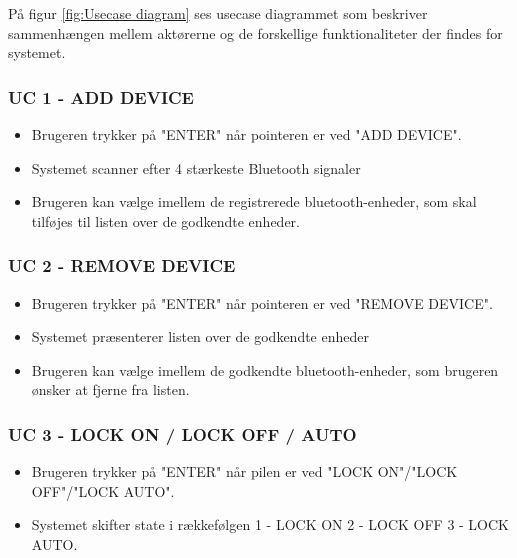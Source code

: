 På figur \ref{fig:Usecase diagram} ses usecase diagrammet som beskriver sammenhængen mellem aktørerne og de forskellige funktionaliteter der findes for systemet.

\subsubsection{UC 1 - ADD DEVICE}
\begin{itemize}
\item Brugeren trykker på "ENTER" når pointeren er ved "ADD DEVICE".
\item Systemet scanner efter 4 stærkeste Bluetooth signaler
\item Brugeren kan vælge imellem de registrerede bluetooth-enheder, som skal tilføjes til listen over de godkendte enheder.
\end{itemize}


\subsubsection{UC 2 - REMOVE DEVICE}

\begin{itemize}
	\item Brugeren trykker på "ENTER" når pointeren er ved "REMOVE DEVICE".
	\item Systemet præsenterer listen over de godkendte enheder
	\item Brugeren kan vælge imellem de godkendte bluetooth-enheder, som brugeren ønsker at fjerne fra listen.
\end{itemize} 

\subsubsection{UC 3 - LOCK ON / LOCK OFF / AUTO}

\begin{itemize}
	\item Brugeren trykker på "ENTER" når pilen er ved "LOCK ON"/"LOCK OFF"/"LOCK AUTO".
	\item Systemet skifter state i rækkefølgen 1 - LOCK ON 2 - LOCK OFF 3 - LOCK AUTO.
\end{itemize}

